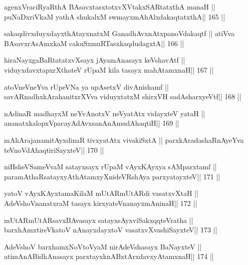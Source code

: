 \begin{shl}
agenxVraciRyaRthA BAsavxtasxtotxvXVtakxSARtatxthA manaH ||
puNaDxriVkaM yathA shukalxM swmayxmAhAlxdakaqtatxthA\hfill || 165 ||
\end{shl}

\begin{shl}
sakaqdivxduyxdayxthA\s tayxnatxM GanadhAvxnAtxpanoVdakaqtf ||
atiVva BAsavxrA\s sAmxkaM cakuSxmuRTasxkaqdudagxtA\hfill || 166 ||
\end{shl}

\begin{shl}
hiraNayxgaBaRtatatxvXsayx jAyamAnasayx keVshavAtf ||
viduyxdavxtapxrXthateV rUpaM kila tasayx mahAtamxnaH\hfill || 167 ||
\end{shl}

\begin{shl}
atoV\s neVneYva rUpeVNa ya upAsetxV divAnishamf ||
savARnadhxkArahanitxrXVva viduyxtatxM shirxVH sadA\s\s sharxyeVtf\hfill || 168 ||
\end{shl}

\begin{shl}
nA\s\s dinaR madhayxM neYvAnotxV neVyatAtx vidayxteV yataH ||
ananatxkalopxVpacayAdAvxsanAnAmudAhaqtiH\hfill || 169 ||
\end{shl}

\begin{shl}
mAhArajanamitAyxdinaR tivxyatAtx vivakiSxtA ||
parxkAradashaRnAyeYva teVnoVdAhaqtiriSayxteV\hfill || 170 ||
\end{shl}

\begin{shl}
niHsheVSameVvaM satayxsayx rUpaM vAyxKAyxya sAMparxtamf ||
paramAthaRsatayxyAthAtamxyXnideVRshAya parxyatayxteV\hfill || 171 ||
\end{shl}

\begin{shl}
yatoV vAyxKAyxtamaKilaM mUtARmUtARdi vasatxvXtaH ||
AdeVshoV\s nanatxraM tasayx kirxyateV\s nanayxmAninaH\hfill || 172 ||
\end{shl}

\begin{shl}
mUtARmUtARsavxBAvasayx satayxsAyx\s\s viSakxqqteVratha ||
barxhAmxtireVkatoV nAnayxdayxtoV vasatxvXvashiSayxteV\hfill || 173 ||
\end{shl}

\begin{shl}
AdeVshoV barxhamxNoV\s toV\s yaM nirAdeVshasayx BaNayxteV ||
atimAnABidhAnasayx parxtayxknABxtArxdavxyAtamxnaH\hfill || 174 ||
\end{shl}

